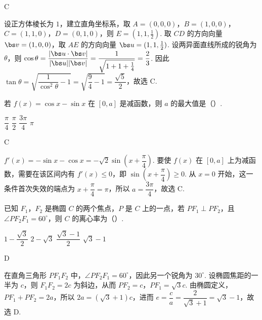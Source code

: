 \begin{answer}
C
\end{answer}

\begin{solution}
设正方体棱长为 \(1\)，建立直角坐标系，取 \(A=(0,0,0)\)，\(B=(1,0,0)\)，\(C=(1,1,0)\)，\(D=(0,1,0)\)，则 \(E=(1,1,\tfrac12)\). 取 \(CD\) 的方向向量 \(\bs v=(1,0,0)\)，取 \(AE\) 的方向向量 \(\bs u=(1,1,\tfrac12)\). 设两异面直线所成的锐角为 \(\theta\)，则
\(\cos\theta=\dfrac{\lvert\bs u\cdot\bs v\rvert}{\lvert\bs u\rvert\lvert\bs v\rvert}=\dfrac1{\sqrt{1+1+\tfrac14}}=\dfrac23\). 因此 \(\tan\theta=\sqrt{\dfrac1{\cos^2\theta}-1}=\sqrt{\dfrac94-1}=\dfrac{\sqrt5}{2}\)，故选 C.
\end{solution}

\begin{problem}
若 \(f(x)=\cos x-\sin x\) 在 \([0,a]\) 是减函数，则 \(a\) 的最大值是（\quad）.

\choices
    {\(\dfrac{\pi}{4}\)}
    {\(\dfrac{\pi}{2}\)}
    {\(\dfrac{3\pi}{4}\)}
    {\(\pi\)}
\end{problem}

\begin{answer}
C
\end{answer}

\begin{solution}
\(f'(x)=-\sin x-\cos x=-\sqrt2\sin\left(x+\dfrac\pi4\right)\). 要使 \(f(x)\) 在 \([0,a]\) 上为减函数，需要在该区间内有 \(f'(x)\le0\)，即 \(\sin\left(x+\dfrac\pi4\right)\ge0\). 从 \(x=0\) 开始，这一条件首次失效的端点为 \(x+\dfrac\pi4=\pi\)，所以 \(a=\dfrac{3\pi}{4}\)，故选 C.
\end{solution}

\begin{problem}
已知 \(F_1\)，\(F_2\) 是椭圆 \(C\) 的两个焦点，\(P\) 是 \(C\) 上的一点，若 \(PF_1\perp PF_2\)，且 \(\angle PF_2F_1=60^\circ\)，则 \(C\) 的离心率为（\quad）.

\choices
    {\(1-\dfrac{\sqrt3}{2}\)}
    {\(2-\sqrt3\)}
    {\(\dfrac{\sqrt3-1}{2}\)}
    {\(\sqrt3-1\)}
\end{problem}

\begin{answer}
D
\end{answer}

\begin{solution}
在直角三角形 \(PF_1F_2\) 中，\(\angle PF_2F_1=60^\circ\)，因此另一个锐角为 \(30^\circ\). 设椭圆焦距的一半为 \(c\)，则 \(F_1F_2=2c\) 为斜边，从而 \(PF_2=c\)，\(PF_1=\sqrt3c\). 由椭圆定义，\(PF_1+PF_2=2a\)，所以 \(2a=(\sqrt3+1)c\)，进而 \(e=\dfrac ca=\dfrac2{\sqrt3+1}=\sqrt3-1\)，故选 D.
\end{solution}

